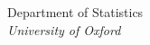 \begin{titlepage}
{
\maketitle
\begin{center}
    \Large
    Department of Statistics\\
    \textit{University of Oxford}\\
\end{center}}
\end{titlepage}
\newpage
